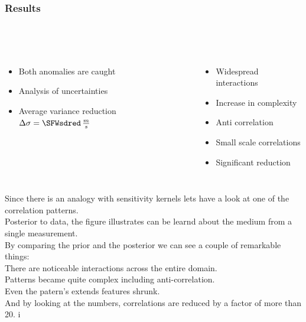 \documentclass[aspectratio=169, t, 10pt,
    ]{beamer}
\begin{document}
\begin{frame}
    \frametitle{Results}
    \framesubtitle{~}

\begin{columns}
%

    \begin{itemize}
        \item Both anomalies are caught
        \item Analysis of uncertainties
        \item Average variance reduction $\Delta\sigma = \SFWsdred \, \frac ms$
    \end{itemize}
    \smallskip

    \begin{itemize}
        \item Widespread interactions
        \item Increase in complexity
        \item Anti correlation
        \item Small scale correlations
        \item Significant reduction
    \end{itemize}


    \vspace{-10mm}
    \centering \scriptsize
\end{columns}

\end{frame}

Since there is an analogy with sensitivity kernels lets have a look at one of the correlation patterns.
\\
Posterior to data, the figure illustrates can be learnd about the medium from a single measurement.
\\
By comparing the prior and the posterior we can see a couple of remarkable things:
\\
There are noticeable interactions across the entire domain.
\\
Patterns became quite complex including anti-correlation.
\\
Even the patern's extends features shrunk.
\\
And by looking at the numbers, correlations are reduced by a factor of more than 20.
i
\end{document}
